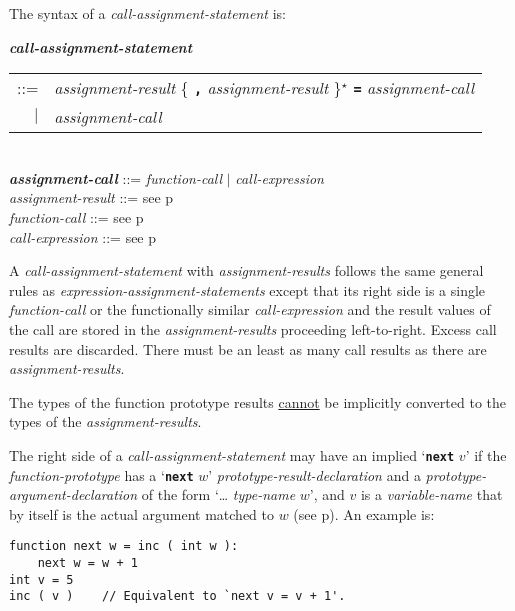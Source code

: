 \documentclass[12pt]{article}
\newcommand{\TT}[1]{{\tt \bfseries #1}}
\newcommand{\STAR}{{\Large $^\star$}}
\newcommand{\emkey}[1]{{\em \bfseries #1}}
\newcommand{\pagref}[1]{p\pageref{#1}}
\newenvironment{indpar}[1][0.3in]%
	{\begin{list}{}%
		     {\setlength{\itemsep}{0in}%
		      \setlength{\topsep}{0in}%
		      \setlength{\parsep}{1ex}%
		      \setlength{\labelwidth}{#1}%
		      \setlength{\leftmargin}{#1}%
		      \addtolength{\leftmargin}{\labelsep}}%
	 \item}%
	{\end{list}}
\begin{document}
The syntax of a {\em call-assignment-statement} is:
\begin{indpar}
\emkey{call-assignment-statement} \\
\hspace*{0.5in} \begin{tabular}{rl}
                ::= & {\em assignment-result}
                      \{ \TT{,} {\em assignment-result} \}\STAR{}
		      \TT{=} {\em assignment-call} \\
		$|$ & {\em assignment-call}
		\end{tabular}
\\[0.5ex]
\emkey{assignment-call} ::= {\em function-call} $|$
                            {\em call-expression}
\\[0.5ex]
{\em assignment-result} ::= see \pagref{ASSIGNMENT-RESULT}
\\[0.5ex]
{\em function-call} ::= see \pagref{FUNCTION-CALL}
\\[0.5ex]
{\em call-expression} ::= see \pagref{CALL-EXPRESSION}
\end{indpar}

A {\em call-assignment-statement} with {\em assignment-results}
follows the same general rules
as {\em expres\-sion-assignment-state\-ments} except that its right
side is a single {\em function-call} or the functionally similar
{\em call-expression} and the result values of the call are stored
in the {\em assignment-results} proceeding left-to-right.
Excess call results are discarded.  There must be an least as many
call results as there are {\em assignment-results}.

The types of the function prototype results \underline{cannot}
be implicitly converted to the types of the {\em assignment-results}.

\label{CALL-NEXT-PROMOTION}
The right side of a {\em call-assignment-statement} may have
an implied `\TT{next} $v$' if the {\em function-prototype} has
a `\TT{next} $w$' {\em prototype-result-declaration}
and a {\em prototype-argument-declaration} of the
form `\dots{} {\em type-name} $w$', and $v$ is a {\em variable-name}
that by itself is the actual argument matched to $w$
(see \pagref{PROTOTYPE-NEXT-RESULT}).  An example is:
\begin{indpar}\begin{verbatim}
function next w = inc ( int w ):
    next w = w + 1
int v = 5
inc ( v )    // Equivalent to `next v = v + 1'.
\end{verbatim}\end{indpar}
\end{document}
